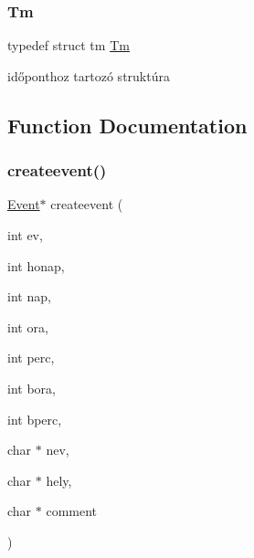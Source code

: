 \subsubsection{\texorpdfstring{Tm}{Tm}}
{\footnotesize\ttfamily typedef struct tm \hyperlink{group__list_gaffc453d30a4a6ce81ed778fd04d2d256}{Tm}}

időponthoz tartozó struktúra 

\subsection{Function Documentation}
\mbox{\label{group__list_ga24fd1b37eee54600b66c42e86b52244a}} 
\subsubsection{\texorpdfstring{createevent()}{createevent()}}
{\footnotesize\ttfamily \hyperlink{struct_event}{Event}$\ast$ createevent (\begin{DoxyParamCaption}\item[{int}]{ev,  }\item[{int}]{honap,  }\item[{int}]{nap,  }\item[{int}]{ora,  }\item[{int}]{perc,  }\item[{int}]{bora,  }\item[{int}]{bperc,  }\item[{char $\ast$}]{nev,  }\item[{char $\ast$}]{hely,  }\item[{char $\ast$}]{comment }\end{DoxyParamCaption})}

